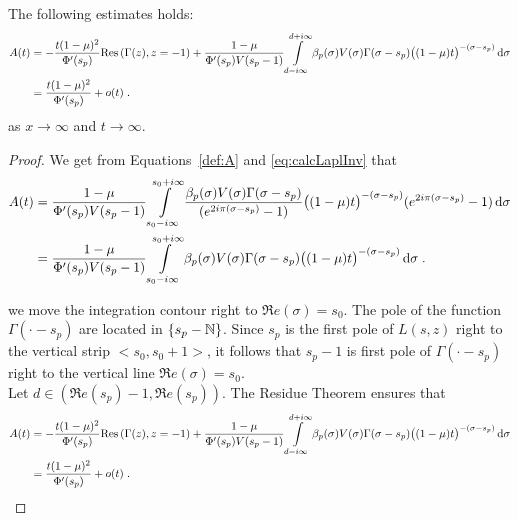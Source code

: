 \documentclass[11pt]{amsart}
\renewcommand{\Re}{\mathfrak{R}e}
\newcommand{\diff}{\,\mathrm{d}}
\newcommand{\res}{\mathrm{Res}\,}
\begin{document}
\begin{lemma} The following estimates holds: 
    \begin{align*}
        A(t) 
        &=  - \frac{t(1-\mu)^2}{\Phi'(s_p)} \res(\Gamma(z), z = -1) +   \frac{1-\mu}{\Phi'(s_p) V(s_p-1)}
         \int\limits_{d-i\infty}^{d+i\infty}
         \beta_p(\sigma) V(\sigma)
       \Gamma(\sigma-s_p)\big((1-\mu)t\big)^{-(\sigma-s_p)} \diff \sigma \\
       &=  \frac{t(1-\mu)^2}{\Phi'(s_p)} + o(t)
      \eqfinp
    \end{align*}
    as $x \to \infty$ and $t \to \infty$.
\end{lemma}
\begin{proof}We get from Equations~\eqref{def:A} and \eqref{eq:calcLaplInv} that 
\begin{subequations}
    \begin{align}
    A(t) 
    &=
    \frac{1-\mu}{\Phi'(s_p) V(s_p-1)}
     \int\limits_{s_0-i\infty}^{s_0+i\infty}
     \frac{\beta_p(\sigma) V(\sigma)\Gamma(\sigma-s_p)
  }{(e^{2i\pi(\sigma-s_p)}-1)} \big((1-\mu)t\big)^{-(\sigma-s_p)}(e^{2i\pi(\sigma-s_p)}-1) \diff \sigma  \\
  &=  
   \frac{1-\mu}{\Phi'(s_p) V(s_p-1)}
     \int\limits_{s_0-i\infty}^{s_0+i\infty}
     \beta_p(\sigma) V(\sigma)
   \Gamma(\sigma-s_p)\big((1-\mu)t\big)^{-(\sigma-s_p)} \diff \sigma
  \eqfinp
\end{align}
\end{subequations}

we move the integration contour right to $\Re(\sigma) = s_0$. The pole of the function $\Gamma(\cdot-s_p)$ are located in $\{s_p - \mathbb{N}\}$. Since $s_p$ is the first pole of $L(s,z)$ right to the vertical strip $<s_0, s_0+1>$, it follows that $s_p-1$ is first pole of $\Gamma(\cdot-s_p)$ right to the vertical line $\Re(\sigma) = s_0$. \\

Let $d \in (\Re(s_p)-1,\Re(s_p))$. The Residue Theorem ensures that 
\begin{align*}
    A(t) 
    &=  - \frac{t(1-\mu)^2}{\Phi'(s_p)} \res(\Gamma(z), z = -1) +   \frac{1-\mu}{\Phi'(s_p) V(s_p-1)}
     \int\limits_{d-i\infty}^{d+i\infty}
     \beta_p(\sigma) V(\sigma)
   \Gamma(\sigma-s_p)\big((1-\mu)t\big)^{-(\sigma-s_p)} \diff \sigma \\
   &=  \frac{t(1-\mu)^2}{\Phi'(s_p)} + o(t)
  \eqfinp
\end{align*}
\end{proof}
\end{document}
